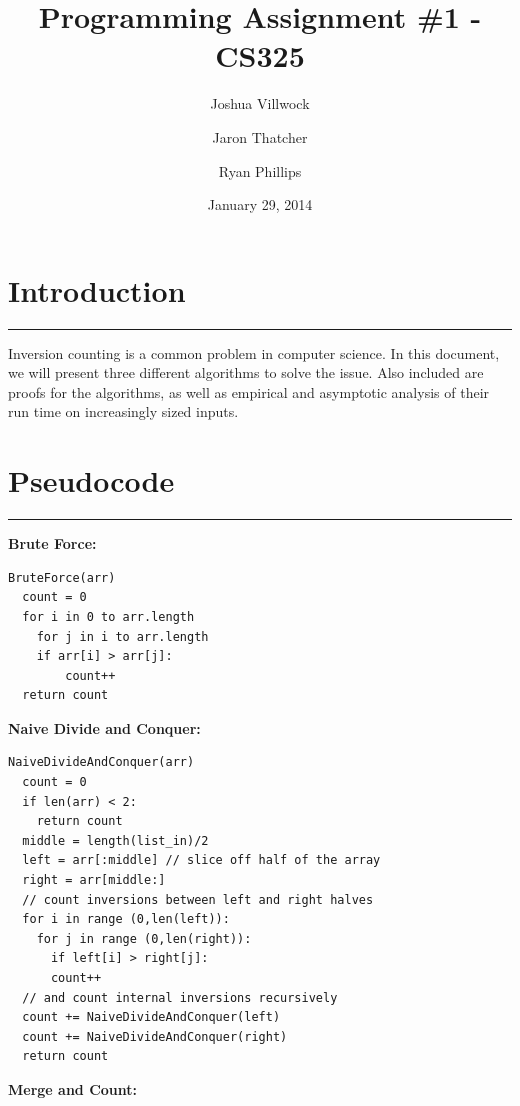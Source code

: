 \documentclass[letterpaper,10pt,titlepage,fleqn]{article}
\begin{document}
\lstset{language=Python} 

\title{Programming Assignment \#1 - CS325}

\author{
	Joshua Villwock \and
	Jaron Thatcher \and
	Ryan Phillips
}

\date{January 29, 2014}
\maketitle
\section*{Introduction}
\hrule

Inversion counting is a common problem in computer science. In this document, we will present three different algorithms to solve the issue. Also included are proofs for the algorithms, as well as empirical and asymptotic analysis of their run time on increasingly sized inputs.


\section*{Pseudocode}
\hrule
\begin{centering}

\textbf{Brute Force:}
\end{centering}
\begin{lstlisting}
BruteForce(arr)
  count = 0
  for i in 0 to arr.length
    for j in i to arr.length
	if arr[i] > arr[j]:
        count++ 
  return count
\end{lstlisting}

\begin{centering}
\textbf{Naive Divide and Conquer:}
\end{centering}
\begin{lstlisting}
NaiveDivideAndConquer(arr)
  count = 0
  if len(arr) < 2:
    return count
  middle = length(list_in)/2
  left = arr[:middle] // slice off half of the array
  right = arr[middle:]
  // count inversions between left and right halves
  for i in range (0,len(left)):
    for j in range (0,len(right)):
      if left[i] > right[j]:
	  count++
  // and count internal inversions recursively
  count += NaiveDivideAndConquer(left)
  count += NaiveDivideAndConquer(right)
  return count
\end{lstlisting}

\begin{centering}
\textbf{Merge and Count:}
\end{centering}
\end{document}

